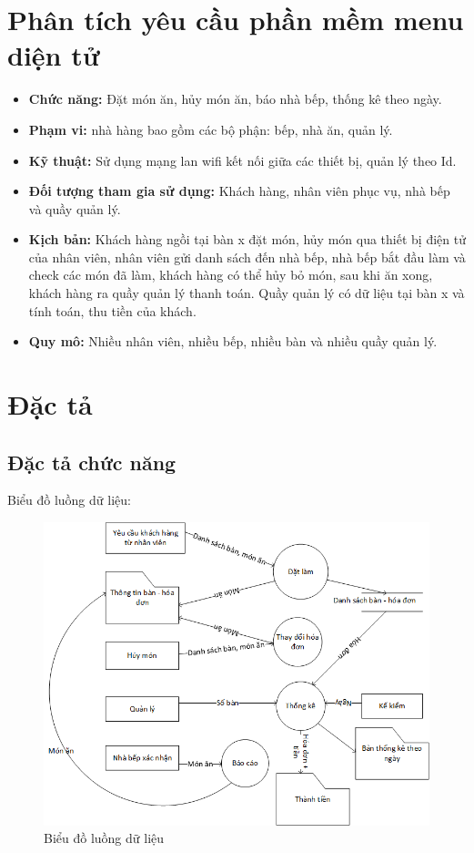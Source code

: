 \documentclass[a4paper,12pt]{report}
\begin{document}
\section{Phân tích yêu cầu phần mềm menu diện tử}
\begin{itemize}
	\item \textbf{Chức năng:} Đặt món ăn, hủy món ăn, báo nhà bếp, thống kê theo ngày.
	\item \textbf{Phạm vi:} nhà hàng bao gồm các bộ phận: bếp, nhà ăn, quản lý.
	\item \textbf{Kỹ thuật:} Sử dụng mạng lan wifi kết nối giữa các thiết bị, quản lý theo Id.
	\item \textbf{Đối tượng tham gia sử dụng:} Khách hàng, nhân viên phục vụ, nhà bếp và quầy quản lý.
	\item \textbf{Kịch bản:} Khách hàng ngồi tại bàn x đặt món, hủy món qua thiết bị điện tử của nhân viên,  nhân viên gửi danh sách đến nhà bếp, nhà bếp bắt đầu làm và check các món đã làm, khách hàng có thể hủy bỏ món, sau khi ăn xong, khách hàng ra quầy quản lý thanh toán. Quầy quản lý có dữ liệu tại bàn x và tính toán, thu tiền của khách.
	\item \textbf{Quy mô:} Nhiều nhân viên, nhiều bếp, nhiều bàn và nhiều quầy quản lý.
\end{itemize}
\section{Đặc tả}
\subsection{Đặc tả chức năng}
Biểu đồ luồng dữ liệu:\\
\begin{figure}[h]
\centering
\includegraphics[scale=0.7]{DFD.png}
\caption{Biểu đồ luồng dữ liệu}
\end{figure}
\end{document}
